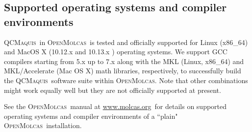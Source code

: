 \documentclass[bibliography=totoc,12pt,a4paper]{scrartcl}
\newcommand{\mol}{\textsc{OpenMolcas}}
\newcommand{\qcm}{\textsc{QCMaquis}}
\newcommand{\hostp}{\mol}
\begin{document}
\subsection{Supported operating systems and compiler environments}\label{subsec:supportedOS}

\qcm\ in \hostp\ is tested and officially supported for Linux (x86\_64)
and MacOS X (10.12.x and 10.13.x ) operating systems. We support GCC compilers starting from 5.x up to 7.x along with the MKL (Linux, x86\_64) and MKL/Accelerate (Mac OS X) math libraries, respectively, to successfully build the \qcm\ software suite within \hostp.
Note that other combinations might work equally well but they are not officially supported at present.

\noindent See the \mol\ manual at \url{www.molcas.org}\ for details on
supported operating systems and compiler environments of a ``plain" \mol\ installation.

\end{document}
